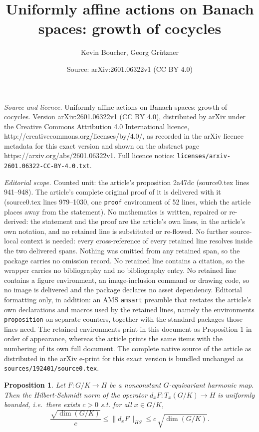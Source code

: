 \documentclass[10pt,a4paper]{amsart}
\title{Uniformly affine actions on Banach spaces: growth of cocycles}
\author{Kevin Boucher, Georg Grützner}
\date{Source: arXiv:2601.06322v1 (CC BY 4.0)}
\newtheorem{proposition}{Proposition}
\begin{document}
\maketitle

\noindent\emph{Source and licence.} Uniformly affine actions on Banach spaces: growth of cocycles. Version arXiv:2601.06322v1 (CC BY 4.0), distributed by arXiv under the Creative Commons Attribution 4.0 International licence, http://creativecommons.org/licenses/by/4.0/, as recorded in the arXiv licence metadata for this exact version and shown on the abstract page https://arxiv.org/abs/2601.06322v1. Full licence notice: \texttt{licenses/arxiv-2601.06322-CC-BY-4.0.txt}.\par\smallskip

\noindent\textit{Editorial scope.} Counted unit: the article's proposition 2a47dc (source0.tex lines 941--948). The article's complete original proof of it is delivered with it (source0.tex lines 979--1030, one \texttt{proof} environment of 52 lines, which the article places away from the statement). No mathematics is written, repaired or re-derived: the statement and the proof are the article's own lines, in the article's own notation, and no retained line is substituted or re-flowed.  No further source-local context is needed: every cross-reference of every retained line resolves inside the two delivered spans.  Nothing was omitted from any retained span, so the package carries no omission record.  No retained line contains a citation, so the wrapper carries no bibliography and no bibliography entry.  No retained line contains a figure environment, an image-inclusion command or drawing code, so no image is delivered and the package declares no asset dependency.  Editorial formatting only, in addition: an AMS \texttt{amsart} preamble that restates the article's own declarations and macros used by the retained lines, namely the environments \texttt{proposition} on separate counters, together with the standard packages those lines need.  The retained environments print in this document as Proposition 1 in order of appearance, whereas the article prints the same items with the numbering of its own full document.  The complete native source of the article as distributed in the arXiv e-print for this exact version is bundled unchanged as \texttt{sources/192401/source0.tex}.
\begin{proposition}
\label{2a47dc}
Let \(F: G/K \to H\) be a nonconstant \(G\)-equivariant harmonic map.
Then the Hilbert-Schmidt norm of the operator
\(d_{x}F: T_{x}(G/K) \to H\) is uniformly bounded, i.e.~there exists
\(c > 0\) s.t. for all \(x \in G/K\),
\[ \frac{\sqrt{ \operatorname{dim}(G/K) }}{c} \leq \|d_{x}F\|_{HS} \leq c \, \sqrt{ \operatorname{dim}(G/K) }.\]
\end{proposition}
\end{document}
